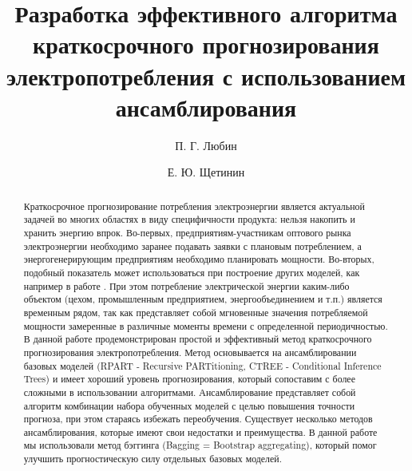 \documentclass[60x84/16,8pt]{ittmm}
\begin{document}

\title{Разработка эффективного алгоритма краткосрочного прогнозирования электропотребления с использованием ансамблирования}

\author[1]{П. Г. Любин}
\author[1]{Е. Ю. Щетинин}

\address[1]{Кафедра прикладной информатики и теории вероятностей,\\
  Российский университет дружбы народов,\\
  ул. Миклухо-Маклая, д.6, Москва, Россия, 117198}


\begin{abstract}
Краткосрочное прогнозирование потребления электроэнергии является актуальной задачей во многих областях в виду специфичности продукта: нельзя накопить и хранить энергию впрок. Во-первых, предприятиям-участникам оптового рынка электроэнергии необходимо заранее подавать заявки с плановым потреблением, а энергогенерирующим предприятиям необходимо планировать мощности. Во-вторых, подобный показатель может использоваться при построение других моделей, как например в работе \cite{Kryanev}. При этом потребление электрической энергии каким-либо объектом (цехом, промышленным предприятием, энергообъединением и т.п.) является временным рядом, так как представляет собой мгновенные значения потребляемой мощности замеренные в различные моменты времени с определенной периодичностью. В данной работе продемонстрирован простой и эффективный метод краткосрочного прогнозирования электропотребления. Метод основывается на ансамблировании базовых моделей (RPART - Recursive PARTitioning, CTREE - Conditional Inference Trees) и имеет хороший уровень прогнозирования, который сопоставим с более сложными в использовании алгоритмами. Ансамблирование представляет собой алгоритм комбинации набора обученных моделей с целью повышения точности прогноза, при этом стараясь избежать переобучения. Существует несколько методов ансамблирования, которые имеют свои недостатки и преимущества. В данной работе мы использовали метод бэггинга (Bagging = Bootstrap aggregating), который помог улучшить прогностическую силу отдельных базовых моделей.
\end{abstract}


\end{document}
